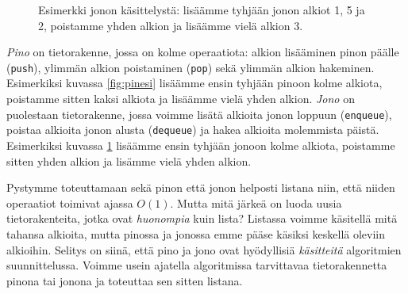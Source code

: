 \begin{figure}
\center
{}
\caption{Esimerkki jonon käsittelystä:
lisäämme tyhjään jonon alkiot 1, 5 ja 2,
poistamme yhden alkion ja lisäämme vielä alkion 3.}
\label{fig:jonesi}
\end{figure}

\emph{Pino} on tietorakenne, jossa on kolme operaatiota:
alkion lisääminen pinon päälle (\texttt{push}),
ylimmän alkion poistaminen (\texttt{pop})
sekä ylimmän alkion hakeminen.
Esimerkiksi kuvassa \ref{fig:pinesi} lisäämme ensin tyhjään pinoon kolme alkiota,
poistamme sitten kaksi alkiota ja lisäämme vielä yhden alkion.
\emph{Jono} on puolestaan tietorakenne, jossa voimme lisätä alkioita
jonon loppuun (\texttt{enqueue}),
poistaa alkioita jonon alusta (\texttt{dequeue})
ja hakea alkioita molemmista päistä.
Esimerkiksi kuvassa \ref{fig:jonesi} lisäämme ensin tyhjään jonoon
kolme alkiota, poistamme sitten yhden alkion ja lisämme vielä yhden alkion.

Pystymme toteuttamaan sekä pinon että jonon helposti
listana niin, että niiden operaatiot toimivat ajassa $O(1)$.
Mutta mitä järkeä on luoda uusia tietorakenteita,
jotka ovat \emph{huonompia} kuin lista?
Listassa voimme käsitellä mitä tahansa alkioita, mutta
pinossa ja jonossa emme pääse käsiksi keskellä oleviin alkioihin.
Selitys on siinä, että pino ja jono ovat hyödyllisiä 
\emph{käsit\-teitä} algoritmien suunnittelussa.
Voimme usein ajatella algoritmissa tarvittavaa
tietorakennetta pinona tai jonona ja toteuttaa sen sitten listana.

